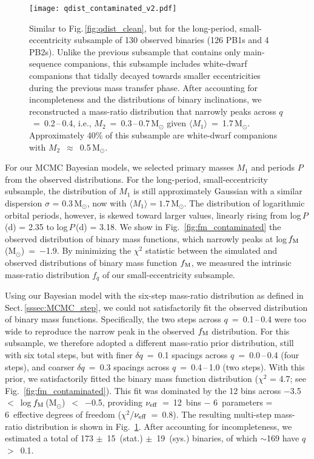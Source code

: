 \documentclass[a4paper,fleqn,usenatbib]{mnras}
\begin{document}
\begin{figure}
\centering
\texttt{[image: qdist\_contaminated\_v2.pdf]}
\caption{Similar to Fig.\,\ref{fig:qdist_clean}, but for the long-period, small-eccentricity subsample of 130 observed binaries (126 PB1s and 4 PB2s).  Unlike the previous subsample that contains only main-sequence companions, this subsample includes white-dwarf companions that tidally decayed towards smaller eccentricities during the previous mass transfer phase.  After accounting for incompleteness and the distributions of binary inclinations, we reconstructed a mass-ratio distribution that narrowly peaks across $q$~=~0.2\,--\,0.4, i.e., $M_2$~=~0.3\,--\,0.7\,M$_{\odot}$ given $\langle M_1 \rangle$~=~1.7\,M$_{\odot}$.  Approximately 40\% of this subsample are white-dwarf companions with $M_2$~$\approx$~0.5\,M$_{\odot}$.}
\label{fig:qdist_contaminated}
\end{figure}


For our MCMC Bayesian models, we selected primary masses $M_1$ and periods $P$ from the observed distributions.  For the long-period, small-eccentricity subsample, the distribution of $M_1$ is still approximately Gaussian with a similar dispersion $\sigma$ = 0.3\,M$_{\odot}$, now with $\langle M_1 \rangle = 1.7$\,M$_{\odot}$.  The distribution of logarithmic orbital periods, however, is skewed toward larger values, linearly rising from log\,$P$\,(d) = 2.35 to log\,$P$\,(d) = 3.18. We show in Fig.~\ref{fig:fm_contaminated} the observed distribution of binary mass functions, which narrowly peaks at log\,$f_{\rm M}$\,(M$_{\odot}$)~=~$-$1.9.  By minimizing the $\chi^2$ statistic between the simulated and observed distributions of binary mass function $f_{\rm M}$, we measured the intrinsic mass-ratio distribution $f_q$ of our small-eccentricity subsample.

Using our Bayesian model with the six-step mass-ratio distribution as defined in Sect.\,\ref{sssec:MCMC_step}, we could not satisfactorily fit the observed distribution of binary mass functions.  Specifically, the two steps across $q$~=~0.1\,--\,0.4 were too wide to reproduce the narrow peak in the observed $f_{\rm M}$ distribution.  For this subsample, we therefore adopted a different mass-ratio prior distribution, still with six total steps, but with finer $\delta q$~=~0.1 spacings across $q$~=~0.0\,--\,0.4 (four steps), and coarser $\delta q$~=~0.3 spacings across $q$~=~0.4\,--\,1.0 (two steps).  With this prior, we satisfactorily fitted the binary mass function distribution ($\chi^2$ = 4.7; see Fig.~\ref{fig:fm_contaminated}).  This fit was dominated by the 12 bins across $-$3.5~$<$~log\,$f_{\rm M}$\,(M$_{\odot}$)~$<$~$-$0.5, providing $\nu_{\rm eff}$~=~12~bins $-$ 6~parameters = 6~effective degrees of freedom ($\chi^2$/$\nu_{\rm eff}$~=~0.8).  The resulting multi-step mass-ratio distribution is shown in Fig.~\ref{fig:qdist_contaminated}. After accounting for incompleteness, we estimated a total of 173 $\pm$~15~(stat.) $\pm$~19~(sys.) binaries, of which $\sim$169 have $q$~$>$~0.1.
\end{document}
